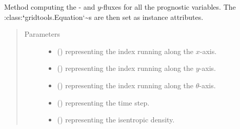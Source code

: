 \documentclass[letterpaper,10pt,english]{sphinxmanual}
\begin{document}
\begin{fulllineitems}
\begin{fulllineitems}
\begin{quote}
\begin{description}
\begin{itemize}
\end{itemize}

\end{description}\end{quote}

\end{fulllineitems}


\begin{fulllineitems}
\label{\detokenize{api:dycore.flux_isentropic_nonconservative_centered.FluxIsentropicNonconservativeCentered._compute_horizontal_fluxes}}
Method computing the - and \(y\)-fluxes for
all the prognostic variables. The :class:{\color{red}\bfseries{}{}`}gridtools.Equation{}`\textasciitilde{}s are then set as instance attributes.
\begin{quote}\begin{description}
\item[{Parameters}] \leavevmode\begin{itemize}
\item {} 
 () \textendash{}  representing the index running along the \(x\)-axis.

\item {} 
 () \textendash{}  representing the index running along the \(y\)-axis.

\item {} 
 () \textendash{}  representing the index running along the \(\theta\)-axis.

\item {} 
 () \textendash{}  representing the time step.

\item {} 
 () \textendash{}  representing the isentropic density.


\end{itemize}
\end{description}
\end{quote}
\end{fulllineitems}
\end{fulllineitems}
\end{document}
